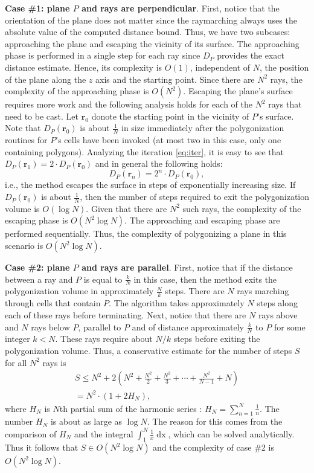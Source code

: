 \documentclass[11pt,twocolumn]{article}
\begin{document}
			\textbf{Case \#1: plane $P$ and rays are perpendicular}.
			First, notice that the orientation of the plane does not matter since the raymarching always uses the absolute value of the computed distance bound.
			Thus, we have two subcases: approaching the plane and escaping the vicinity of its surface.
			The approaching phase is performed in a single step for each ray since $D_P$ provides the exact distance estimate.
			Hence, its complexity is $O(1)$, independent of $N$, the position of the plane along the $z$ axis and the starting point.
			Since there are $N^2$ rays, the complexity of the approaching phase is $O(N^2)$.
			Escaping the plane's surface requires more work and the following analysis holds for each of the $N^2$ rays that need to be cast.
			Let $\mathbf{r}_0$ donote the starting point in the vicinity of $P$'s surface.
			Note that $D_P(\mathbf{r}_0)$ is about $\frac{1}{N}$ in size immediately after the polygonization routines for $P$'s cells have been invoked
			(at most two in this case, only one containing polygons).
			Analyzing the iteration \eqref{eq:iter}, it is easy to see that $D_P(\mathbf{r}_1)=2\cdot D_P(\mathbf{r}_0)$ and in general the following holds:
			\begin{equation}
				D_P(\mathbf{r}_n)=2^n\cdot D_P(\mathbf{r}_0)
				,
			\end{equation}
			i.e., the method escapes the surface in steps of exponentially increasing size.
			If $D_P(\mathbf{r}_0)$ is about $\frac{1}{N}$, then the number of steps required to exit the polygonization volume is $O(\log N)$.
			Given that there are $N^2$ such rays, the complexity of the escaping phase is $O(N^2\log N)$.
			The approaching and escaping phase are performed sequentially.
			Thus, the complexity of polygonizing a plane in this scenario is $O(N^2\log N)$.

			\textbf{Case \#2: plane $P$ and rays are parallel}.
			First, notice that if the distance between a ray and $P$ is equal to $\frac{k}{N}$ in this case, then the method exits the polygonization volume in approximately $\frac{N}{k}$ steps.
			There are $N$ rays marching through cells that contain $P$.
			The algorithm takes approximately $N$ steps along each of these rays before terminating.
			Next, notice that there are $N$ rays above and $N$ rays below $P$, parallel to $P$ and of distance approximately $\frac{k}{N}$ to $P$ for some integer $k < N$.
			These rays require about $N/k$ steps before exiting the polygonization volume.
			Thus, a conservative estimate for the number of steps $S$ for all $N^2$ rays is
			\begin{multline}
				S\leq
				N^2 + 2\left( N^2 + \frac{N^2}{2} + \frac{N^2}{3} + \cdots + \frac{N^2}{N-1}  + N \right)\\
				=N^2\cdot\left(1 + 2H_N\right)
				,
			\end{multline}
			where $H_N$ is $N$th partial sum of the harmonic series \cite{hseries}: $H_N=\sum_{n=1}^N \frac{1}{n}$.
			The number $H_N$ is about as large as $\log N$.
			The reason for this comes from the comparison of $H_N$ and the integral $\int_1^{N}\frac{1}{x}\mathop{dx}$,
			which can be solved analytically.
			Thus it follows that $S\in O(N^2\log N)$ and the complexity of case \#2 is $O(N^2\log N)$.
\end{document}
